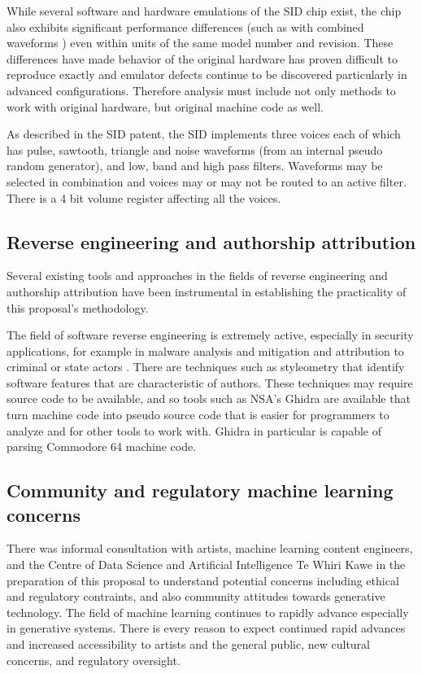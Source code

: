 \documentclass[10pt]{article}
\begin{document}
\begin{multicols*}{2}
While several software and hardware emulations of the SID chip exist, the chip also exhibits significant performance differences (such as with combined waveforms \cite{fixcombwaveforms}) even within units of the same model number and revision. These differences have made behavior of the original hardware has proven difficult to reproduce exactly and emulator defects continue to be discovered particularly in advanced configurations. Therefore analysis must include not only methods to work with original hardware, but original machine code as well.

As described in the SID patent\cite{sidpatent}, the SID implements three voices each of which has pulse, sawtooth, triangle and noise waveforms (from an internal pseudo random generator), and low, band and high pass filters. Waveforms may be selected in combination and voices may or may not be routed to an active filter. There is a 4 bit volume register affecting all the voices.

\subsection{Reverse engineering and authorship attribution}

Several existing tools and approaches in the fields of reverse engineering and authorship attribution have been instrumental in establishing the practicality of this proposal's methodology.

The field of software reverse engineering is extremely active, especially in security applications, for example in malware analysis and mitigation and attribution to criminal or state actors \cite{mohammed2022malgridvisualizationbinaryfeatures}. There are techniques such as styleometry\cite{10.1145/3292577} that identify software features that are characteristic of authors. These techniques may require source code to be available, and so tools such as NSA's Ghidra\cite{ghidra} are available that turn machine code into pseudo source code that is easier for programmers to analyze and for other tools to work with. Ghidra in particular is capable of parsing Commodore 64 machine code.

\subsection{Community and regulatory machine learning concerns}

There was informal consultation with artists, machine learning content engineers, and the Centre of Data Science and Artificial Intelligence Te Whiri Kawe in the preparation of this proposal
to understand potential concerns including ethical and regulatory contraints, and also community attitudes towards generative technology. The field of machine learning continues to rapidly advance especially in generative systems. There is every reason to expect continued rapid advances and increased accessibility to artists and the general public, new cultural concerns, and regulatory oversight.


\end{multicols*}
\end{document}
